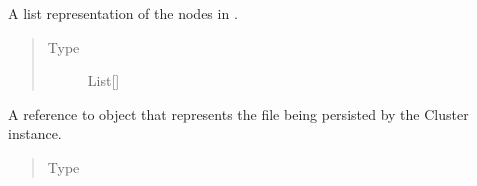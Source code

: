 \documentclass[letterpaper,10pt,english]{sphinxmanual}
\begin{document}
\begin{fulllineitems}
\begin{fulllineitems}
\begin{quote}
\begin{description}
\end{description}\end{quote}

\end{fulllineitems}


\begin{fulllineitems}
\label{\detokenize{app.domain:app.domain.cluster_groups.Cluster._members_view}}
A list representation of the nodes in {\hyperref[\detokenize{app.domain:app.domain.cluster_groups.Cluster.members}]{}}.
\begin{quote}\begin{description}
\item[{Type}] \leavevmode
List{[}{\hyperref[\detokenize{app:app.type_hints.NodeType}]{}}{]}

\end{description}\end{quote}

\end{fulllineitems}


\begin{fulllineitems}
\label{\detokenize{app.domain:app.domain.cluster_groups.Cluster.file}}
A reference to
{\hyperref[\detokenize{app.domain.helpers:app.domain.helpers.smart_dataclasses.FileData}]{}}
object that represents the file being persisted by the Cluster
instance.
\begin{quote}\begin{description}
\item[{Type}] \leavevmode
{\hyperref[\detokenize{app.domain.helpers:app.domain.helpers.smart_dataclasses.FileData}]{}}

\end{description}\end{quote}

\end{fulllineitems}



\end{fulllineitems}
\end{document}
